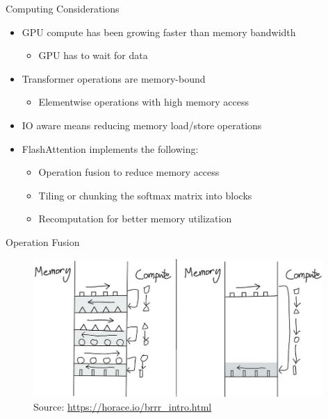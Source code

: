 \begin{vbframe}{Computing Considerations}

\vfill

\begin{itemize}
	\item GPU compute has been growing faster than memory bandwidth
	\begin{itemize}
		\item GPU has to wait for data
	\end{itemize}
	\item Transformer operations are memory-bound
	\begin{itemize}
		\item Elementwise operations with high memory access
	\end{itemize}
	\item IO aware means reducing memory load/store operations
	\item FlashAttention implements the following:
	\begin{itemize}
		\item Operation fusion to reduce memory access
		\item Tiling or chunking the softmax matrix into blocks
		\item Recomputation for better memory utilization
	\end{itemize}
\end{itemize}

\vfill

\end{vbframe}


\begin{vbframe}{Operation Fusion}

\vfill

\begin{figure}
	\centering
	\includegraphics[width = 11cm]{./figure/op_fusion.png} \\ 
	{\footnotesize Source: \href{https://horace.io/brrr_intro.html}{\url{https://horace.io/brrr_intro.html}}}
\end{figure}

\vfill

\end{vbframe}

